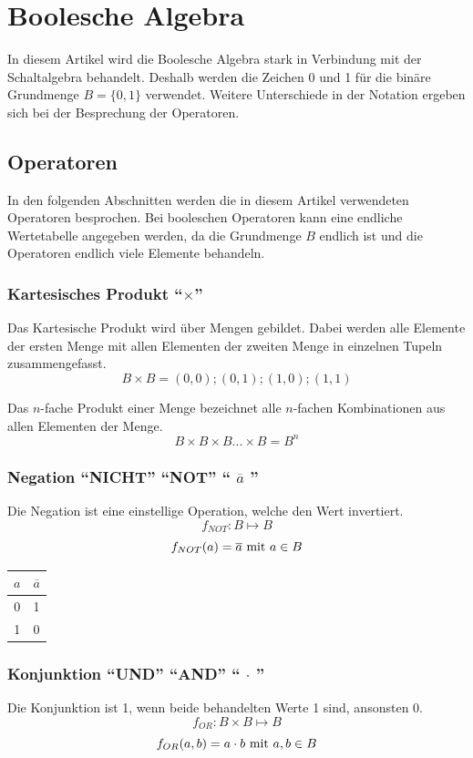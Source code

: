 \documentclass[11pt,a4paper]{scrreprt}
\begin{document}
\chapter{Boolesche Algebra}
In diesem Artikel wird die Boolesche Algebra stark in Verbindung mit der Schaltalgebra behandelt. Deshalb werden die Zeichen 0 und 1 für die binäre Grundmenge $B = \{0,1\}$ verwendet. Weitere Unterschiede in der Notation ergeben sich bei der Besprechung der Operatoren.

\section{Operatoren}
In den folgenden Abschnitten werden die in diesem Artikel verwendeten Operatoren besprochen. Bei booleschen Operatoren kann eine endliche Wertetabelle angegeben werden, da die Grundmenge $B$ endlich ist und die Operatoren endlich viele Elemente behandeln.

\subsection{Kartesisches Produkt "`$\times$"'}
Das Kartesische Produkt wird über Mengen gebildet. Dabei werden alle Elemente der ersten Menge mit allen Elementen der zweiten Menge in einzelnen Tupeln zusammengefasst.
$$ B \times B = (0,0); (0,1); (1,0); (1,1)$$

Das $n$-fache Produkt einer Menge bezeichnet alle $n$-fachen Kombinationen aus allen Elementen der Menge.
$$ B \times B  \times B ...  \times B = B^n$$

\subsection{Negation "`NICHT"' "`NOT"' "` $\overline{a}$ "'}
Die Negation ist eine einstellige Operation, welche den Wert invertiert.
$$ f_{NOT}: B \mapsto B $$
$$ f_{NOT}(a) = \overline{a} \textnormal{ mit } a \in B$$

\begin{center}
\begin{tabular}{cc}
	$a$ & $\overline a$ \\ \hline
	0  & 1           \\
	1  & 0           \\
\end{tabular}
\end{center}

\subsection{Konjunktion "`UND"' "`AND"' "` $\cdot$ "'}
Die Konjunktion ist 1, wenn beide behandelten Werte 1 sind, ansonsten 0.
$$ f_{OR}: B \times B \mapsto B $$
$$ f_{OR}(a, b) = a \cdot b \textnormal{ mit } a, b \in B$$
\end{document}
